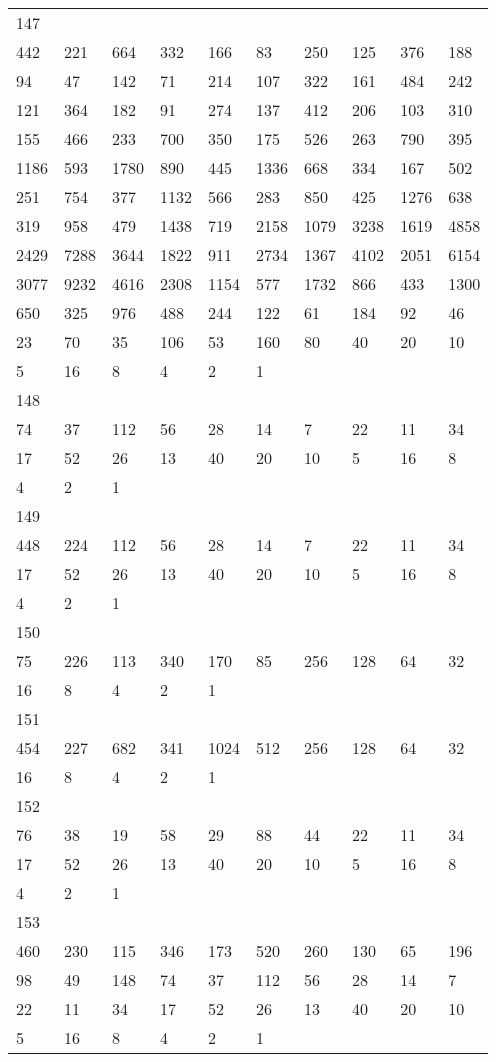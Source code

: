 \begin{longtable}{*{10}{l}}
147&&&&&&&&&\\
442& 221& 664& 332& 166& 83& 250& 125& 376& 188\\
94& 47& 142& 71& 214& 107& 322& 161& 484& 242\\
121& 364& 182& 91& 274& 137& 412& 206& 103& 310\\
155& 466& 233& 700& 350& 175& 526& 263& 790& 395\\
1186& 593& 1780& 890& 445& 1336& 668& 334& 167& 502\\
251& 754& 377& 1132& 566& 283& 850& 425& 1276& 638\\
319& 958& 479& 1438& 719& 2158& 1079& 3238& 1619& 4858\\
2429& 7288& 3644& 1822& 911& 2734& 1367& 4102& 2051& 6154\\
3077& 9232& 4616& 2308& 1154& 577& 1732& 866& 433& 1300\\
650& 325& 976& 488& 244& 122& 61& 184& 92& 46\\
23& 70& 35& 106& 53& 160& 80& 40& 20& 10\\
5& 16& 8& 4& 2& 1& \\

148&&&&&&&&&\\
74& 37& 112& 56& 28& 14& 7& 22& 11& 34\\
17& 52& 26& 13& 40& 20& 10& 5& 16& 8\\
4& 2& 1& \\

149&&&&&&&&&\\
448& 224& 112& 56& 28& 14& 7& 22& 11& 34\\
17& 52& 26& 13& 40& 20& 10& 5& 16& 8\\
4& 2& 1& \\

150&&&&&&&&&\\
75& 226& 113& 340& 170& 85& 256& 128& 64& 32\\
16& 8& 4& 2& 1& \\

151&&&&&&&&&\\
454& 227& 682& 341& 1024& 512& 256& 128& 64& 32\\
16& 8& 4& 2& 1& \\

152&&&&&&&&&\\
76& 38& 19& 58& 29& 88& 44& 22& 11& 34\\
17& 52& 26& 13& 40& 20& 10& 5& 16& 8\\
4& 2& 1& \\

153&&&&&&&&&\\
460& 230& 115& 346& 173& 520& 260& 130& 65& 196\\
98& 49& 148& 74& 37& 112& 56& 28& 14& 7\\
22& 11& 34& 17& 52& 26& 13& 40& 20& 10\\
5& 16& 8& 4& 2& 1& \\


\end{longtable}
